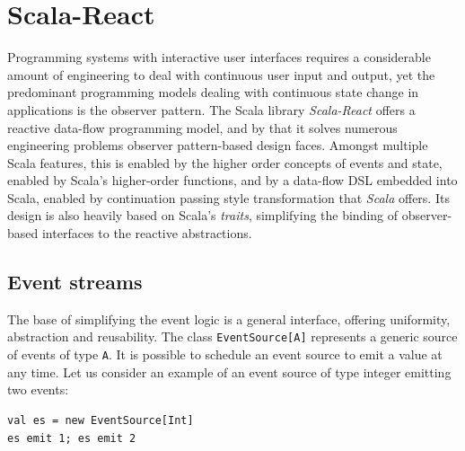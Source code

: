 



\section{Scala-React}\label{sec:scala-react}

Programming systems with interactive user interfaces requires a considerable amount of engineering to deal with continuous user input and output, yet the predominant programming models dealing with continuous state change in applications is the observer pattern. The Scala library \emph{Scala-React} offers a reactive data-flow programming model, and by that it solves numerous engineering problems observer pattern-based design faces. Amongst multiple Scala features, this is enabled by the higher order concepts of events and state, enabled by Scala's higher-order functions, and by a data-flow DSL embedded into Scala, enabled by continuation passing style transformation that \emph{Scala} offers. Its design is also heavily based on Scala's \emph{traits}, simplifying the binding of observer-based interfaces to the reactive abstractions.\cite{DeprecatingObservers}

\subsection{Event streams}

The base of simplifying the event logic is a general interface, offering uniformity, abstraction and reusability. The class {\tt EventSource[A]} represents a generic source of events of type {\tt A}. It is possible to schedule an event source to emit a value at any time. Let us consider an example of an event source of type integer emitting two events:
\begin{lstlisting}
val es = new EventSource[Int]
es emit 1; es emit 2
\end{lstlisting}

